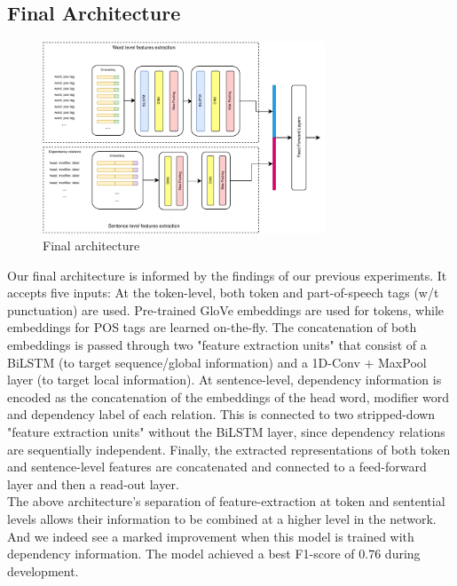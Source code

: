 \documentclass[11pt]{article}
\begin{document}
\subsection{Final Architecture}

\begin{figure}[]
	\centering
	\includegraphics[width=0.75\textwidth]{model_arch.pdf}
	\caption{Final architecture}
	\label{fig:final_model}
\end{figure}

Our final architecture is informed by the findings of our previous experiments. It accepts five inputs: At the token-level, both  token
and part-of-speech tags (w/t punctuation) are used. Pre-trained GloVe embeddings are used for tokens, while embeddings for POS tags
are learned on-the-fly. The concatenation of both embeddings is passed through two "feature extraction units" that consist of a
BiLSTM (to target sequence/global information) and a 1D-Conv + MaxPool layer (to target local information). At sentence-level,
dependency information is encoded as the concatenation of the embeddings of the head word, modifier word and dependency label of each relation.
This is connected to two stripped-down "feature extraction units" without the BiLSTM layer, since dependency relations are
sequentially independent. Finally, the extracted representations of both token and sentence-level features are concatenated and
connected to a feed-forward layer and then a read-out layer.\\

The above architecture's separation of feature-extraction at token and sentential levels allows their information to be combined
at a higher level in the network. And we indeed see a marked improvement when this model is trained with dependency information.
The model achieved a best F1-score of $0.76$ during development.
\end{document}
